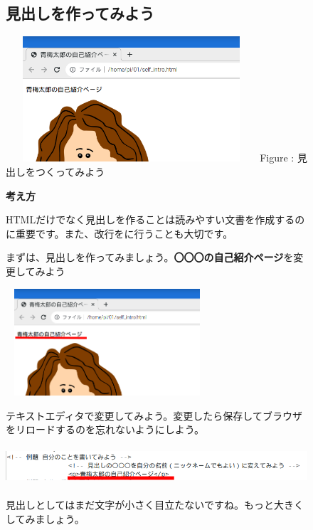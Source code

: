\documentclass[a4paper,12pt]{jarticle}
\begin{document}
\vfill
\clearpage
\begin{figure}[ht]
  \subsection{\theExercise 見出しを作ってみよう}


  \centering
  \begin{minipage}{9.327cm}
    {\upshape
      \includegraphics[width=9.327cm,height=4.662cm]{textbook-img153.png}
      \newline
      Figure : 見出しをつくってみよう}
  \end{minipage}


  \bigskip
  \flushleft

  \textbf{考え方}



  \begin{minipage}{16.576cm}
    \flushleft

    HTMLだけでなく見出しを作ることは読みやすい文書を作成するのに重要です。また、改行をに行うことも大切です。

    まずは、見出しを作ってみましょう。\textbf{〇〇〇の自己紹介ページ}を変更してみよう


    \bigskip

    \includegraphics[width=7.544cm,height=3.981cm]{textbook-img154.png}


    \bigskip

    テキストエディタで変更してみよう。変更したら保存してブラウザをリロードするのを忘れないようにしよう。


    \bigskip

    \includegraphics[width=14.907cm,height=1.423cm]{textbook-img155.png}


    \bigskip


    見出しとしてはまだ文字が小さく目立たないですね。もっと大きくしてみましょう。




    \bigskip
  \end{minipage}

\end{figure}
\end{document}
